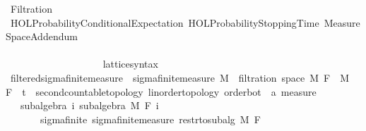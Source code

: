 %
\begin{isabellebody}%
%
%
\isadelimtheory
%
\endisadelimtheory
%
\isatagtheory
{}\isamarkupfalse%
\ Filtration\isanewline
{}\ {\isachardoublequoteopen}HOL{\isacharminus}{\kern0pt}Probability{\isachardot}{\kern0pt}Conditional{\isacharunderscore}{\kern0pt}Expectation{\isachardoublequoteclose}\ {\isachardoublequoteopen}HOL{\isacharminus}{\kern0pt}Probability{\isachardot}{\kern0pt}Stopping{\isacharunderscore}{\kern0pt}Time{\isachardoublequoteclose}\ Measure{\isacharunderscore}{\kern0pt}Space{\isacharunderscore}{\kern0pt}Addendum\isanewline
{}%
\endisatagtheory
{\isafoldtheory}%
%
\isadelimtheory
\ \ \ \ \ \ \ \ \ \ \ \ \ \ \ \ \ \ \ \ \ \ \ \ \ \ \ \ \ \ \ \ \ \ \ \ \ \ \ \ \ \ \ \ \ \ \ \ \ \ \ \ \ \ \ \ \ \ \ \ \ \ \ \ \ \ \ \ \ \ \ \ \ \ \ \ \ \ \ \ \ \ \ \ \ \ \ \ \ \ \isanewline
%
\endisadelimtheory
\isanewline
{}\isamarkupfalse%
\ lattice{\isacharunderscore}{\kern0pt}syntax%
\isadelimdocument
%
\endisadelimdocument
%
\isatagdocument
%
\isamarkuptrue%
%
\endisatagdocument
{\isafolddocument}%
%
\isadelimdocument
%
\endisadelimdocument
{}\isamarkupfalse%
\ filtered{\isacharunderscore}{\kern0pt}sigma{\isacharunderscore}{\kern0pt}finite{\isacharunderscore}{\kern0pt}measure\ {\isacharequal}{\kern0pt}\ sigma{\isacharunderscore}{\kern0pt}finite{\isacharunderscore}{\kern0pt}measure\ M\ {\isacharplus}{\kern0pt}\ filtration\ {\isachardoublequoteopen}space\ M{\isachardoublequoteclose}\ F\ \ M\ \ F\ {\isacharcolon}{\kern0pt}{\isacharcolon}{\kern0pt}\ {\isachardoublequoteopen}{\isacharprime}{\kern0pt}t\ {\isacharcolon}{\kern0pt}{\isacharcolon}{\kern0pt}\ {\isacharbraceleft}{\kern0pt}second{\isacharunderscore}{\kern0pt}countable{\isacharunderscore}{\kern0pt}topology{\isacharcomma}{\kern0pt}\ linorder{\isacharunderscore}{\kern0pt}topology{\isacharcomma}{\kern0pt}\ order{\isacharunderscore}{\kern0pt}bot{\isacharbraceright}{\kern0pt}\ {\isasymRightarrow}\ {\isacharprime}{\kern0pt}a\ measure{\isachardoublequoteclose}\ {\isacharplus}{\kern0pt}\isanewline
\ \ \ subalgebra{\isacharcolon}{\kern0pt}\ {\isachardoublequoteopen}{\isasymAnd}i{\isachardot}{\kern0pt}\ subalgebra\ M\ {\isacharparenleft}{\kern0pt}F\ i{\isacharparenright}{\kern0pt}{\isachardoublequoteclose}\isanewline
\ \ \ \ \ \ \ sigma{\isacharunderscore}{\kern0pt}finite{\isacharcolon}{\kern0pt}\ {\isachardoublequoteopen}sigma{\isacharunderscore}{\kern0pt}finite{\isacharunderscore}{\kern0pt}measure\ {\isacharparenleft}{\kern0pt}restr{\isacharunderscore}{\kern0pt}to{\isacharunderscore}{\kern0pt}subalg\ M\ {\isacharparenleft}{\kern0pt}F\ {\isasymbottom}{\isacharparenright}{\kern0pt}{\isacharparenright}{\kern0pt}{\isachardoublequoteclose}\isanewline

\end{isabellebody}
